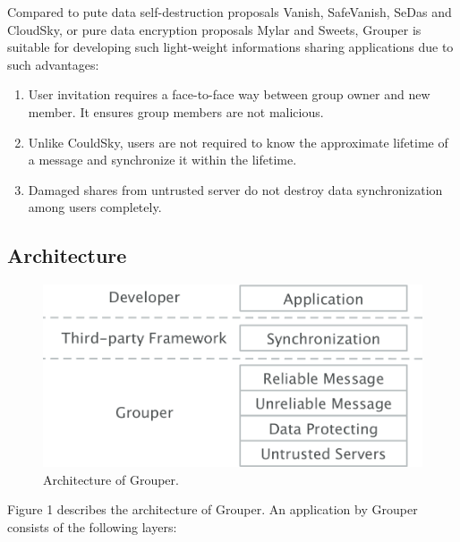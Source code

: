 \documentclass[twocolumn,10pt]{article}
\begin{document}
Compared to pute data self-destruction proposals Vanish, SafeVanish, SeDas and CloudSky, or pure data encryption proposals Mylar and Sweets, Grouper is suitable for developing such light-weight informations sharing applications due to such advantages:

\begin{enumerate}
	\setlength{\itemsep}{1pt}
	\setlength{\parskip}{0pt}
	\setlength{\parsep}{0pt}
	\item User invitation requires a face-to-face way between group owner and new member. It ensures group members are not malicious.
	\item Unlike CouldSky, users are not required to know the approximate lifetime of a message and synchronize it within the lifetime.
	\item Damaged shares from untrusted server do not destroy data synchronization among users completely.
\end{enumerate}

\subsection{Architecture}

\begin{figure}[t]
	\centering
	\includegraphics[scale=0.36]{architecture}
	\caption{Architecture of Grouper.}
\end{figure}

Figure 1 describes the architecture of Grouper. 
An application by Grouper consists of the following layers:
\end{document}
